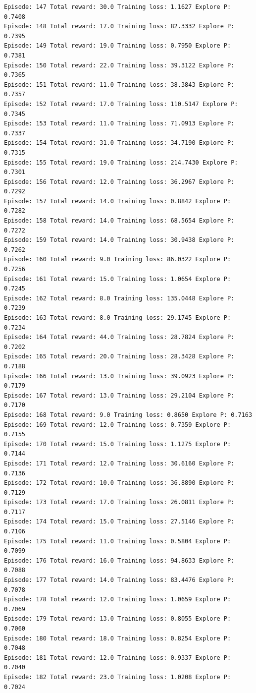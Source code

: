 \documentclass[11pt]{article}
\begin{document}
\begin{Verbatim}[commandchars=\\\{\}]
Episode: 147 Total reward: 30.0 Training loss: 1.1627 Explore P: 0.7408
Episode: 148 Total reward: 17.0 Training loss: 82.3332 Explore P: 0.7395
Episode: 149 Total reward: 19.0 Training loss: 0.7950 Explore P: 0.7381
Episode: 150 Total reward: 22.0 Training loss: 39.3122 Explore P: 0.7365
Episode: 151 Total reward: 11.0 Training loss: 38.3843 Explore P: 0.7357
Episode: 152 Total reward: 17.0 Training loss: 110.5147 Explore P: 0.7345
Episode: 153 Total reward: 11.0 Training loss: 71.0913 Explore P: 0.7337
Episode: 154 Total reward: 31.0 Training loss: 34.7190 Explore P: 0.7315
Episode: 155 Total reward: 19.0 Training loss: 214.7430 Explore P: 0.7301
Episode: 156 Total reward: 12.0 Training loss: 36.2967 Explore P: 0.7292
Episode: 157 Total reward: 14.0 Training loss: 0.8842 Explore P: 0.7282
Episode: 158 Total reward: 14.0 Training loss: 68.5654 Explore P: 0.7272
Episode: 159 Total reward: 14.0 Training loss: 30.9438 Explore P: 0.7262
Episode: 160 Total reward: 9.0 Training loss: 86.0322 Explore P: 0.7256
Episode: 161 Total reward: 15.0 Training loss: 1.0654 Explore P: 0.7245
Episode: 162 Total reward: 8.0 Training loss: 135.0448 Explore P: 0.7239
Episode: 163 Total reward: 8.0 Training loss: 29.1745 Explore P: 0.7234
Episode: 164 Total reward: 44.0 Training loss: 28.7824 Explore P: 0.7202
Episode: 165 Total reward: 20.0 Training loss: 28.3428 Explore P: 0.7188
Episode: 166 Total reward: 13.0 Training loss: 39.0923 Explore P: 0.7179
Episode: 167 Total reward: 13.0 Training loss: 29.2104 Explore P: 0.7170
Episode: 168 Total reward: 9.0 Training loss: 0.8650 Explore P: 0.7163
Episode: 169 Total reward: 12.0 Training loss: 0.7359 Explore P: 0.7155
Episode: 170 Total reward: 15.0 Training loss: 1.1275 Explore P: 0.7144
Episode: 171 Total reward: 12.0 Training loss: 30.6160 Explore P: 0.7136
Episode: 172 Total reward: 10.0 Training loss: 36.8890 Explore P: 0.7129
Episode: 173 Total reward: 17.0 Training loss: 26.0811 Explore P: 0.7117
Episode: 174 Total reward: 15.0 Training loss: 27.5146 Explore P: 0.7106
Episode: 175 Total reward: 11.0 Training loss: 0.5804 Explore P: 0.7099
Episode: 176 Total reward: 16.0 Training loss: 94.8633 Explore P: 0.7088
Episode: 177 Total reward: 14.0 Training loss: 83.4476 Explore P: 0.7078
Episode: 178 Total reward: 12.0 Training loss: 1.0659 Explore P: 0.7069
Episode: 179 Total reward: 13.0 Training loss: 0.8055 Explore P: 0.7060
Episode: 180 Total reward: 18.0 Training loss: 0.8254 Explore P: 0.7048
Episode: 181 Total reward: 12.0 Training loss: 0.9337 Explore P: 0.7040
Episode: 182 Total reward: 23.0 Training loss: 1.0208 Explore P: 0.7024

\end{Verbatim}
\end{document}
